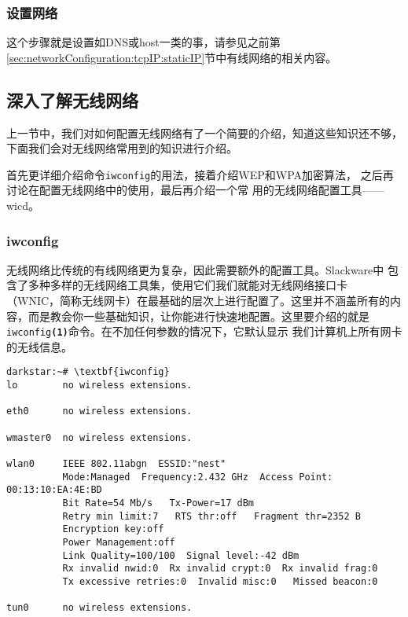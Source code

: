 \subsubsection{设置网络}
\label{sec:networkConfiguration:wireless:setup:configNetwork}
这个步骤就是设置如DNS或host一类的事，请参见之前第
\ref{sec:networkConfiguration:tcpIP:staticIP}节中有线网络的相关内容。

\subsection{深入了解无线网络}
\label{sec:networkConfiguration:wireless:details}
上一节中，我们对如何配置无线网络有了一个简要的介绍，知道这些知识还不够，
下面我们会对无线网络常用到的知识进行介绍。

首先更详细介绍命令\texttt{iwconfig}的用法，接着介绍WEP和WPA加密算法，
之后再讨论在配置无线网络中的使用，最后再介绍一个常
用的无线网络配置工具——wicd。

\subsubsection{iwconfig}
\label{sec:networkConfiguration:wireless:details:iwconfig}
无线网络比传统的有线网络更为复杂，因此需要额外的配置工具。Slackware中
包含了多种多样的无线网络工具集，使用它们我们就能对无线网络接口卡
（WNIC，简称无线网卡）在最基础的层次上进行配置了。这里并不涵盖所有的内
容，而是教会你一些基础知识，让你能进行快速地配置。这里要介绍的就是
\texttt{iwconfig\textbf{(1)}}命令。在不加任何参数的情况下，它默认显示
我们计算机上所有网卡的无线信息。
\begin{Verbatim}[frame=single,commandchars=\\\{\}]
darkstar:~# \textbf{iwconfig}
lo        no wireless extensions.

eth0      no wireless extensions.

wmaster0  no wireless extensions.

wlan0     IEEE 802.11abgn  ESSID:"nest"  
          Mode:Managed  Frequency:2.432 GHz  Access Point:
00:13:10:EA:4E:BD   
          Bit Rate=54 Mb/s   Tx-Power=17 dBm   
          Retry min limit:7   RTS thr:off   Fragment thr=2352 B   
          Encryption key:off
          Power Management:off
          Link Quality=100/100  Signal level:-42 dBm  
          Rx invalid nwid:0  Rx invalid crypt:0  Rx invalid frag:0
          Tx excessive retries:0  Invalid misc:0   Missed beacon:0

tun0      no wireless extensions.
\end{Verbatim}

